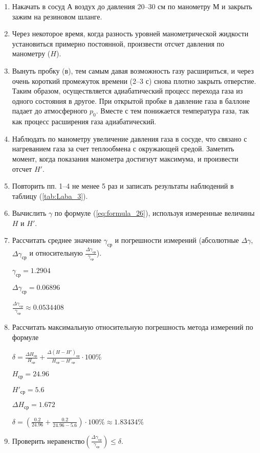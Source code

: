 \begin{enumerate}
    \item {Накачать в сосуд $А$ воздух до давления 20--30 см по манометру $М$ и закрыть зажим на резиновом шланге.}
    \item {Через некоторое время, когда разность уровней манометрической жидкости установиться примерно постоянной, произвести отсчет давления по манометру ($H$).}
    \item {Вынуть пробку (в), тем самым давая возможность газу расшириться, и через очень короткий промежуток времени (2--3 с) снова плотно закрыть отверстие. Таким образом, осуществляется адиабатический процесс перехода газа из одного состояния в другое. При открытой пробке в давление газа в баллоне падает до атмосферного $p_0$. Вместе с тем понижается температура газа, так как процесс расширения газа адиабатический.}
    \item {Наблюдать по манометру увеличение давления газа в сосуде, что связано с нагреванием газа за счет теплообмена с окружающей средой. Заметить момент, когда показания манометра достигнут максимума, и произвести отсчет $H'$.}
    \item {Повторить пп. 1--4 не менее 5 раз и записать результаты наблюдений в таблицу (\ref{tab:Laba_3}).}
    \item {Вычислить $\gamma$ по формуле (\ref{eq:formula_26}), используя измеренные величины $H$ и $H'$.}
    \item {Рассчитать среднее значение $\gamma_\text{ср}$ и погрешности измерений (абсолютные $\Delta \gamma$, $\Delta \gamma_\text{ср}$ и относительную $\frac{\Delta \gamma_\text{ср}}{\gamma_\text{ср}}$).

            $\gamma_\text{ср} = 1.2904$

            $\Delta \gamma_\text{ср} = 0.06896$

            $\frac{\Delta \gamma_\text{ср}}{\gamma_\text{ср}} \approx 0.0534408$
        }
    \item {Рассчитать максимальную относительную погрешность метода измерений по формуле

            $\delta = \frac{\Delta H_\text{ср}}{H_\text{ср}} + \frac{\Delta \left (H - H' \right )_\text{ср}}{H_\text{ср} - H'_\text{ср}} \cdot 100\%$

            $H_\text{ср} = 24.96$

            $H'_\text{ср} = 5.6$

            $\Delta H_\text{ср} = 1.672$

            $\delta = \left (\frac{0.2}{24.96} + \frac{0.2}{24.96 - 5.6} \right ) \cdot 100\% \approx 1.83434\%$
        }
    \item {Проверить неравенство$\left (\frac{\Delta \gamma_\text{ср}}{\gamma_\text{ср}} \right ) \leq \delta$.

}
\end{enumerate}
